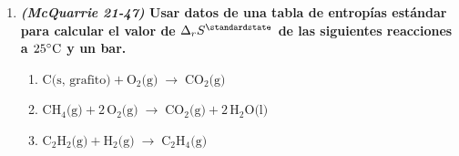\documentclass[a4paper,12pt]{article}
\begin{document}
\begin{enumerate}
Lo que indica que el proceso no es espont\'aneo a esa temperatura. A $T=80.09\celsius+273.15=353.24\;\mbox{K}$ ser\'ia: \\
\begin{center}
\begin{tabular}{r c l}
$\Delta_{vap}\bar{G}$ & $=$ & $\Delta_{vap}\bar{H}-T\Delta_{vap}\bar{S}$ \\
& $=$ & $30.72\;\mbox{kJ}\cdot\mbox{mol}^{-1}-(353.24\;\mbox{K})(86.99\;\mbox{J}\cdot{K}^{-1}\cdot\mbox{mol}^{-1})$ \\
& $=$ & $0$
\end{tabular}
\end{center}

Lo que indica que el proceso est\'a en equilibrio a esa temperatura. Por \'ultimo, a $T=85.0\celsius+273.15=358.15\;\mbox{K}$ ser\'ia: \\
\begin{center}
\begin{tabular}{r c l}
$\Delta_{vap}\bar{G}$ & $=$ & $\Delta_{vap}\bar{H}-T\Delta_{vap}\bar{S}$ \\
& $=$ & $30.72\;\mbox{kJ}\cdot\mbox{mol}^{-1}-(358.15\;\mbox{K})(86.99\;\mbox{J}\cdot{K}^{-1}\cdot\mbox{mol}^{-1})$ \\
& $=$ & $-0.43\;\mbox{kJ}\cdot\mbox{mol}^{-1}$
\end{tabular}
\end{center}

Lo que indica que el proceso es espont\'aneo a esa temperatura.

 \item \textbf{\textit{(McQuarrie 21-47)} Usar datos de una tabla de entrop\'ias est\'andar para calcular el valor de $\Delta_rS^\standardstate$ de las siguientes reacciones a $25\celsius$ y un bar.}
 \begin{enumerate}
  \item $\mbox{C(s, grafito)}+\mbox{O}_2\mbox{(g)}\;\rightarrow\;\mbox{CO}_2\mbox{(g)}$
  \item $\mbox{CH}_4\mbox{(g)}+2\,\mbox{O}_2\mbox{(g)}\;\rightarrow\;\mbox{CO}_2\mbox{(g)}+2\,\mbox{H}_2\mbox{O(l)}$
  \item $\mbox{C}_2\mbox{H}_2\mbox{(g)}+\mbox{H}_2\mbox{(g)}\;\rightarrow\;\mbox{C}_2\mbox{H}_4\mbox{(g)}$
 \end{enumerate} %


\end{enumerate}
\end{document}
